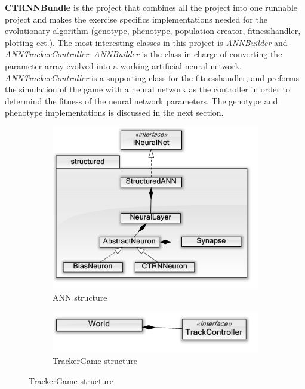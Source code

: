 \documentclass[10pt]{article}
\begin{document}
		\textbf{CTRNNBundle} is the project that combines all the project into one runnable project and makes the exercise specifics implementations needed for the evolutionary algorithm (genotype, phenotype, population creator, fitnesshandler, plotting ect.). The most interesting classes in this project is \textit{ANNBuilder} and \textit{ANNTrackerController}. \textit{ANNBuilder} is the class in charge of converting the parameter array evolved into a working artificial neural network. \textit{ANNTrackerController} is a supporting class for the fitnesshandler, and preforms the simulation of the game with a neural network as the controller in order to determind the fitness of the  neural network parameters. The genotype and phenotype implementations is discussed in the next section. 
		
	\begin{figure}
		\centering
		\begin{subfigure}{.3\textwidth}
			\centering
			\includegraphics[width=\linewidth]{./../images/ANN.png}
			\caption{ANN structure}
			\label{fig:annstruct}
		\end{subfigure}
		\begin{subfigure}{.3\textwidth}
			\centering
			\includegraphics[width=\linewidth]{./../images/TrackerGame.png}
			\caption{TrackerGame structure}

\end{subfigure}
\end{figure}
\end{document}
